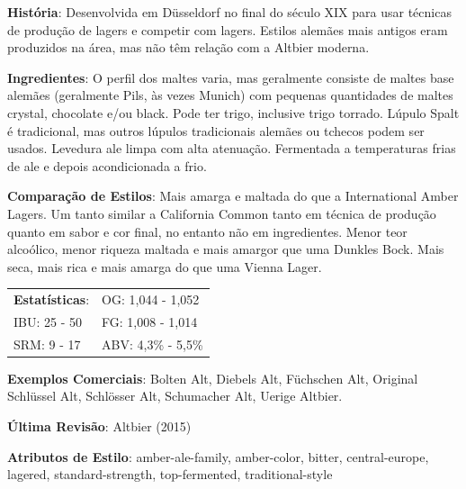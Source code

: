 \textbf{História}: Desenvolvida em Düsseldorf no final do século XIX para usar técnicas de produção de lagers e competir com lagers. Estilos alemães mais antigos eram produzidos na área, mas não têm relação com a Altbier moderna.

\textbf{Ingredientes}: O perfil dos maltes varia, mas geralmente consiste de maltes base alemães (geralmente Pils, às vezes Munich) com pequenas quantidades de maltes crystal, chocolate e/ou black. Pode ter trigo, inclusive trigo torrado. Lúpulo Spalt é tradicional, mas outros lúpulos tradicionais alemães ou tchecos podem ser usados. Levedura ale limpa com alta atenuação. Fermentada a temperaturas frias de ale e depois acondicionada a frio.

\textbf{Comparação de Estilos}: Mais amarga e maltada do que a International Amber Lagers. Um tanto similar a California Common tanto em técnica de produção quanto em sabor e cor final, no entanto não em ingredientes. Menor teor alcoólico, menor riqueza maltada e mais amargor que uma Dunkles Bock. Mais seca, mais rica e mais amarga do que uma Vienna Lager.

\begin{tabular}{@{}p{35mm}p{35mm}@{}}
  \textbf{Estatísticas}: & OG: 1,044 - 1,052 \\
  IBU: 25 - 50 & FG: 1,008 - 1,014 \\
  SRM: 9 - 17 & ABV: 4,3\% - 5,5\%
\end{tabular}

\textbf{Exemplos Comerciais}: Bolten Alt, Diebels Alt, Füchschen Alt, Original Schlüssel Alt, Schlösser Alt, Schumacher Alt, Uerige Altbier.

\textbf{Última Revisão}: Altbier (2015)

\textbf{Atributos de Estilo}: amber-ale-family, amber-color, bitter, central-europe, lagered, standard-strength, top-fermented, traditional-style
